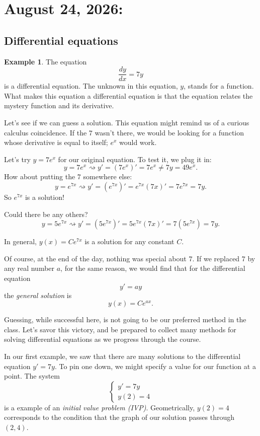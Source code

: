 \documentclass[12pt]{amsart}
\numberwithin{equation}{section}
\theoremstyle{plain} %
\newcommand{\aug}[2]{\section{August #1, 2026: \textsection{#2}}}
\newcommand{\rsa}{\rightsquigarrow}
\theoremstyle{definition}
\newtheorem{ex}[equation]{Example}
\theoremstyle{remark}
\begin{document}
\setcounter{tocdepth}{1}
\tableofcontents







\aug{24}{1.1}

\subsection*{Differential equations}

\begin{ex}
The equation
\[ \frac{dy}{dx} = 7 y\]
is a differential equation. The unknown in this equation, $y$, stands for a function. What makes this equation a differential equation is that the equation relates the mystery function and its derivative.

Let's see if we can guess a solution. This equation might remind us of a curious calculus coincidence. If the $7$ wasn't there, we would be looking for a function whose derivative is equal to itself; $e^x$ would work. 

Let's try $y=7e^x$ for our original equation. To test it, we plug it in:
\[ y = 7 e^x \rsa y' = (7e^x)' = 7e^x \neq 7y = 49e^x.\]
How about putting the $7$ somewhere else:
\[  y = e^{7x} \rsa y' = (e^{7x})' = e^{7x} (7x)' = 7 e^{7x} = 7y.\]
So $e^{7x}$ is a solution!

Could there be any others?
\[  y = 5e^{7x} \rsa y' = (5e^{7x})' = 5e^{7x} (7x)' = 7 (5e^{7x}) = 7y.\]

In general, $y(x) = C e^{7x}$ is a solution for any constant $C$.
\end{ex}

Of course, at the end of the day, nothing was special about $7$. If we replaced $7$ by any real number $a$, for the same reason, we would find that for the differential equation
\[ y' = ay\]
the \emph{general solution} is
\[ y(x) = C e^{ax}.\]

Guessing, while successful here, is not going to be our preferred method in the class. Let's savor this victory, and be prepared to collect many methods for solving differential equations as we progress through the course.

In our first example, we saw that there are many solutions to the differential equation $y'=7y$. To pin one down, we might specify a value for our function at a point. The system
\[\begin{cases} y' = 7y \\ 
y(2)=4 \end{cases}\]
is a example of an \emph{initial value problem (IVP)}. Geometrically, $y(2)=4$ corresponds to the condition that the graph of our solution passes through $(2,4)$.
\end{document}
